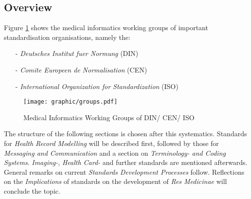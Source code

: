 %
%
%
%
%
%
%

\subsection{Overview}
\label{overview_heading}

Figure \ref{groups_figure} shows the medical informatics working groups of
important standardisation organisations, namely the:

\begin{itemize}
    \item[-] \emph{Deutsches Institut fuer Normung} (DIN)
    \item[-] \emph{Comite Europeen de Normalisation} (CEN)
    \item[-] \emph{International Organization for Standardization} (ISO)
\end{itemize}

\begin{figure}[ht]
    \begin{center}
        \texttt{[image: graphic/groups.pdf]}
        \caption{Medical Informatics Working Groups of DIN/ CEN/ ISO \cite{atgexpertsreport}}
        \label{groups_figure}
    \end{center}
\end{figure}

The structure of the following sections is chosen after this systematics.
Standards for \emph{Health Record Modelling} will be described first, followed
by those for \emph{Messaging and Communication} and a section on
\emph{Terminology- and Coding Systems}. \emph{Imaging-}, \emph{Health Card-}
and further standards are mentioned afterwards. General remarks on current
\emph{Standards Development Processes} follow. Reflections on the
\emph{Implications} of standards on the development of \emph{Res Medicinae}
will conclude the topic.
